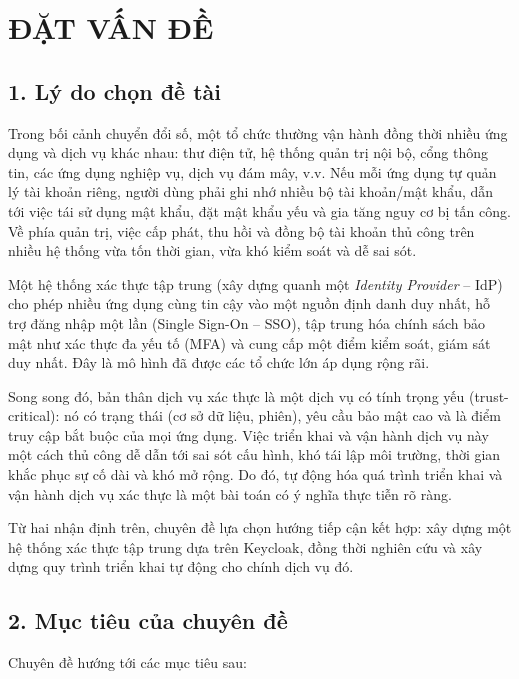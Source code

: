 \chapter*{ĐẶT VẤN ĐỀ}

\section*{1. Lý do chọn đề tài}

Trong bối cảnh chuyển đổi số, một tổ chức thường vận hành đồng thời nhiều ứng
dụng và dịch vụ khác nhau: thư điện tử, hệ thống quản trị nội bộ, cổng thông
tin, các ứng dụng nghiệp vụ, dịch vụ đám mây, v.v. Nếu mỗi ứng dụng tự quản lý
tài khoản riêng, người dùng phải ghi nhớ nhiều bộ tài khoản/mật khẩu, dẫn tới
việc tái sử dụng mật khẩu, đặt mật khẩu yếu và gia tăng nguy cơ bị tấn công.
Về phía quản trị, việc cấp phát, thu hồi và đồng bộ tài khoản thủ công trên
nhiều hệ thống vừa tốn thời gian, vừa khó kiểm soát và dễ sai sót.

Một hệ thống xác thực tập trung (xây dựng quanh một
\textit{Identity Provider} -- IdP) cho phép nhiều ứng dụng cùng tin cậy vào
một nguồn định danh duy nhất, hỗ trợ đăng nhập một lần (Single
Sign-On -- SSO), tập trung hóa chính sách bảo mật như xác thực đa yếu tố
(MFA) và cung cấp một điểm kiểm soát, giám sát duy nhất. Đây là mô hình đã
được các tổ chức lớn áp dụng rộng rãi.

Song song đó, bản thân dịch vụ xác thực là một dịch vụ có tính trọng yếu (trust-critical): nó có trạng thái (cơ sở dữ liệu, phiên), yêu cầu bảo
mật cao và là điểm truy cập bắt buộc của mọi ứng dụng. Việc triển khai và vận
hành dịch vụ này một cách thủ công dễ dẫn tới sai sót cấu hình, khó
tái lập môi trường, thời gian khắc phục sự cố dài và khó mở rộng. Do đó, tự
động hóa quá trình triển khai và vận hành dịch vụ xác thực là một bài toán có
ý nghĩa thực tiễn rõ ràng.

Từ hai nhận định trên, chuyên đề lựa chọn hướng tiếp cận kết hợp: xây dựng một
hệ thống xác thực tập trung dựa trên Keycloak, đồng thời nghiên cứu và xây
dựng quy trình triển khai tự động cho chính dịch vụ đó.

\section*{2. Mục tiêu của chuyên đề}

Chuyên đề hướng tới các mục tiêu sau:

